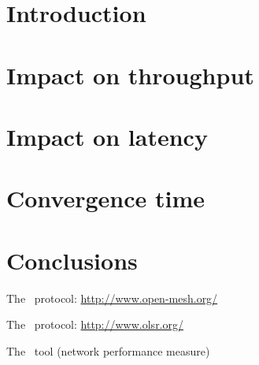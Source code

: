 \documentclass{article}
\begin{document}
\thispagestyle{empty}
\tableofcontents

\clearpage
\setcounter{page}{1}

\section{Introduction} \label{sec:Intro}
\vspace{-3mm}\HRule

    

\section{Impact on throughput} \label{sec:ImpactThroughput}
\vspace{-3mm}\HRule

    

\section{Impact on latency} \label{sec:ImpactLatency}
\vspace{-3mm}\HRule

    

\section{Convergence time} \label{sec:Convergence}
\vspace{-3mm}\HRule

    

\clearpage
\section{Conclusions} \label{sec:Conclusions}
\vspace{-3mm}\HRule

%    



\begin{thebibliography}{99}

     The \batman\ protocol:
    \url{http://www.open-mesh.org/}

     The \olsr\ protocol:
    \url{http://www.olsr.org/}

     The \netperf\ tool (network performance
    measure)

%
%

\end{thebibliography}
\end{document}
